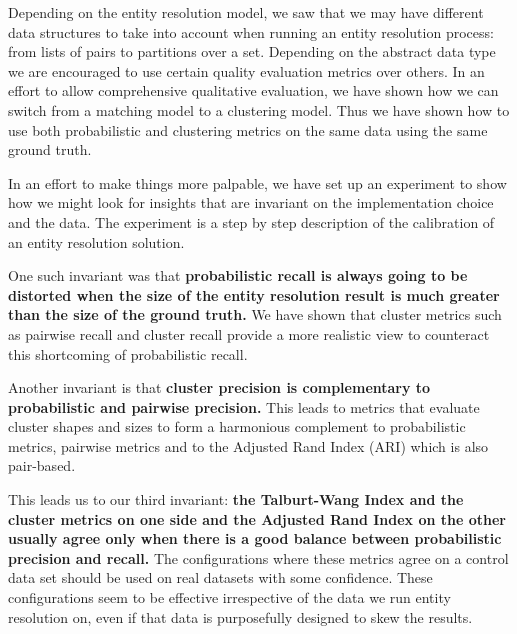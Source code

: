 \documentclass[journal]{IEEEtran}
\begin{document}
    Depending on the entity resolution model, we saw that we may have different
    data structures to take into account when running an entity resolution
    process: from lists of pairs to partitions over a set.
    Depending on the abstract data type we are encouraged to use certain quality
    evaluation metrics over others.
    In an effort to allow comprehensive qualitative evaluation, we have shown
    how we can switch from a matching model to a clustering model.
    Thus we have shown how to use both probabilistic and clustering metrics on
    the same data using the same ground truth.

    In an effort to make things more palpable, we have set up an experiment to
    show how we might look for insights that are invariant on the implementation
    choice and the data.
    The experiment is a step by step description of the calibration of an entity
    resolution solution.
    
    One such invariant was that \textbf{probabilistic recall is always going to
    be distorted when the size of the entity resolution result is much greater
    than the size of the ground truth.}
    We have shown that cluster metrics such as pairwise recall and cluster
    recall provide a more realistic view to counteract this shortcoming of
    probabilistic recall.

    Another invariant is that \textbf{cluster precision is complementary to
    probabilistic and pairwise precision.}
    This leads to metrics that evaluate cluster shapes and sizes to form a
    harmonious complement to probabilistic metrics, pairwise metrics and to the
    Adjusted Rand Index (ARI) which is also pair-based.
    
    This leads us to our third invariant: \textbf{the Talburt-Wang Index and the
    cluster metrics on one side and the Adjusted Rand Index on the other usually
    agree only when there is a good balance between probabilistic precision and
    recall.}
    The configurations where these metrics agree on a control data set should be
    used on real datasets with some confidence.
    These configurations seem to be effective irrespective of the data we run
    entity resolution on, even if that data is purposefully designed to skew the
    results.

\end{document}
